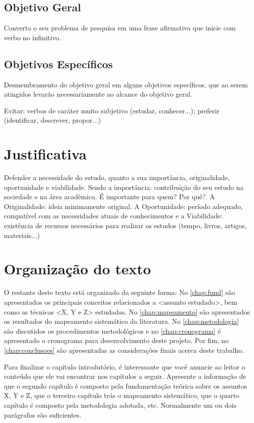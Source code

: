 \subsection{Objetivo Geral}
Converta o seu problema de pesquisa em uma frase afirmativa que inicie com verbo no infinitivo.

\subsection{Objetivos Específicos}
Desmembramento do objetivo geral em alguns objetivos específicos, que ao serem atingidos levarão necessariamente ao alcance do objetivo geral.

Evitar: verbos de caráter muito subjetivo (estudar, 
conhecer...); preferir (identificar, descrever, propor...)

\section{Justificativa}
\label{sec:justificativa}

Defender a necessidade do estudo, quanto a sua importância, originalidade, oportunidade e viabilidade. Sendo a importância: contribuição do seu estudo na sociedade e na área acadêmica. É importante para 
quem? Por quê?. A Originalidade: ideia minimamente original. A Oportunidade: período adequado, compatível com as necessidades atuais de conhecimentos e a Viabilidade: existência de recursos necessários para 
realizar os estudos (tempo, livros, artigos, materiais...)

\section{Organização do texto}
\label{sec:organizacao}

O restante deste texto está organizado da seguinte forma: No \autoref{chap:fund} são apresentados os principais conceitos relacionados a <assunto estudado>, bem como as técnicas <X, Y e Z> estudadas. No \autoref{chap:mapeamento} são apresentados os resultados do mapeamento sistemático da literatura. No \autoref{chap:metodologia} são discutidos os procedimentos metodológicos e no \autoref{chap:cronograma} é apresentado o cronograma para desenvolvimento deste projeto. Por fim, no \autoref{chap:conclusoes} são apresentadas as considerações finais acerca deste trabalho.

Para finalizar o capítulo introdutório, é interessante que você anuncie ao leitor o 
conteúdo que ele vai encontrar nos capítulos a seguir. Apresente a informação de que o segundo capítulo 
é composto pela fundamentação teórica sobre os assuntos X, Y e Z, que o terceiro capítulo trás o 
mapeamento sistemático, que o quarto capítulo é composto pela metodologia adotada, etc. Normalmente um ou dois parágrafos são suficientes.